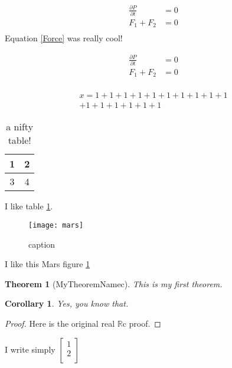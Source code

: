 \documentclass[a4paper, 11pt]{article}
\newtheorem{theorem}{Theorem}[section] %
\newtheorem{corollary}{Corollary}[theorem] %
\newcommand{\R}{\mathbb{R}}
\newcommand{\cv}[2]{\begin{bmatrix}
    #1 \\
    #2 \\
    \end{bmatrix}}
\begin{document}
\begin{align}
    \label{NewtonLaw}
    \frac{\partial P}{\partial t} &= 0 \\
    F_1 + F_2 &= 0 \\
\end{align}
Equation \ref{Force} was really cool!

\begin{equation}
    \begin{split}
    \frac{\partial P}{\partial t} &= 0 \\
    F_1 + F_2 &= 0 \\   
    \end{split}
\end{equation}

\begin{multline}
    x = 1 + 1 + 1 + 1 + 1 + 1 + 1 + 1 + 1 + 1\\
     + 1 + 1 + 1 + 1 + 1 + 1 
\end{multline}

\begin{table}
    \caption{a nifty table!}

    \label{niftytable}
    \begin{center}
\begin{tabular}{|c|c|}
    \hline
    1 & 2 \\ \hline
    3 & 4 \\ \hline
\end{tabular}
    \end{center}
\end{table}

I like table \ref{niftytable}.

\begin{figure}
    \centering
    \texttt{[image: mars]}
    \caption{caption}
    \label{mars}
\end{figure}

I like this Mars figure \ref{mars}


\begin{theorem}[MyTheoremNamec] This is my first theorem.    
\end{theorem}
\begin{corollary}
    Yes, you know that.
\end{corollary}
\begin{proof}
    Here is the original real $\R$c proof.
\end{proof}

I write simply $\cv{1}{2}$

\end{document}
